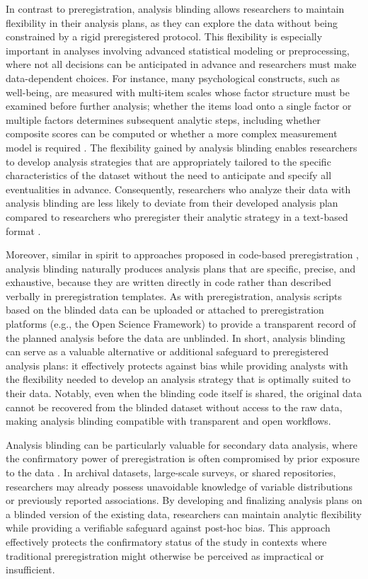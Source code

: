 In contrast to preregistration, analysis blinding allows researchers to maintain flexibility in their analysis plans, as they can explore the data without being constrained by a rigid preregistered protocol. This flexibility is especially important in analyses involving advanced statistical modeling or preprocessing, where not all decisions can be anticipated in advance and researchers must make data-dependent choices. For instance, many psychological constructs, such as well-being, are measured with multi-item scales whose factor structure must be examined before further analysis; whether the items load onto a single factor or multiple factors determines subsequent analytic steps, including whether composite scores can be computed or whether a more complex measurement model is required \citep[see e.g.,][]{MARP2022discussion}. The flexibility gained by analysis blinding enables researchers to develop analysis strategies that are appropriately tailored to the specific characteristics of the dataset without the need to anticipate and specify all eventualities in advance. Consequently, researchers who analyze their data with analysis blinding are less likely to deviate from their developed analysis plan compared to researchers who preregister their analytic strategy in a text-based format \citep{sarafoglou2023comparing}.

Moreover, similar in spirit to approaches proposed in code-based preregistration \citep{peikert2021reproducible, vanlissa2021worcs}, analysis blinding naturally produces analysis plans that are specific, precise, and exhaustive, because they are written directly in code rather than described verbally in preregistration templates. As with preregistration, analysis scripts based on the blinded data can be uploaded or attached to preregistration platforms (e.g., the Open Science Framework) to provide a transparent record of the planned analysis before the data are unblinded. In short, analysis blinding can serve as a valuable alternative or additional safeguard to preregistered analysis plans: it effectively protects against bias while providing analysts with the flexibility needed to develop an analysis strategy that is optimally suited to their data. Notably, even when the blinding code itself is shared, the original data cannot be recovered from the blinded dataset without access to the raw data, making analysis blinding compatible with transparent and open workflows.

Analysis blinding can be particularly valuable for secondary data analysis, where the confirmatory power of preregistration is often compromised by prior exposure to the data \citep{Thibault2023-of}. In archival datasets, large-scale surveys, or shared repositories, researchers may already possess unavoidable knowledge of variable distributions or previously reported associations. By developing and finalizing analysis plans on a blinded version of the existing data, researchers can maintain analytic flexibility while providing a verifiable safeguard against post-hoc bias. This approach effectively protects the confirmatory status of the study in contexts where traditional preregistration might otherwise be perceived as impractical or insufficient.

